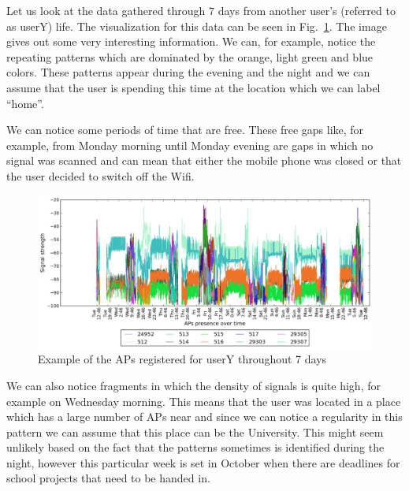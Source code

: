 Let us look at the data gathered through $7$ days from another user's (referred
to as userY) life. The visualization for this data can be seen in
Fig.~\ref{user_3_7d}. The image gives out some very interesting information. We
can, for example, notice the repeating patterns which are dominated by the
orange, light green and blue colors. These patterns appear during the evening
and the night and we can assume that the user is spending this time at the
location which we can label ``home''.

We can notice some periods of time that are free. These free gaps like, for
example, from Monday morning until Monday evening are gaps in which no signal
was scanned and can mean that either the mobile phone was closed or that the
user decided to switch off the Wifi.

\begin{figure}[h]
\centering
\includegraphics[height =
0.45\textwidth]{figures/user_3_sorted_7days_plot.png}
\caption{Example of the APs registered for userY throughout 7 days}
\label{user_3_7d}
\end{figure}

We can also notice fragments in which the density of signals is quite high, for
example on Wednesday morning. This means that the user was located in a place
which has a large number of APs near and since we can notice a regularity in
this pattern we can assume that this place can be the University. This might
seem unlikely based on the fact that the patterns sometimes is identified during
the night, however this particular week is set in October when there are
deadlines for school projects that need to be handed in.

